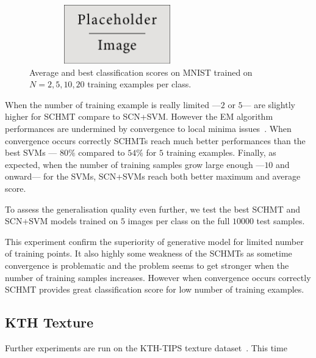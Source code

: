 \documentclass{article}
\begin{document}
		\begin{figure}
			\begin{center}
				\includegraphics[width=3in, height= 1in]{placeholder.jpg}
			  \caption[MNIST: classification scores]{Average and best classification scores on MNIST trained on $N=2,5,10,20$ training examples per class.}
			  \label{fig:SCHMT MNIST}
			\end{center}
			\vspace{-20pt}
		\end{figure}
		When the number of training example is really limited ---\ie $2$ or $5$--- are slightly higher for SCHMT compare to SCN+SVM. However the EM algorithm performances are undermined by convergence to local minima issues~\cite{moon1996expectation}. When convergence occurs correctly SCHMTs reach much better performances than the best SVMs --- $80\%$ compared to $54\%$ for $5$ training examples. Finally, as expected, when the number of training samples grow large enough ---\ie $10$ and onward--- for the SVMs, SCN+SVMs reach both better maximum and average score.
		
		To assess the generalisation quality even further, we test the best SCHMT and SCN+SVM models trained on $5$ images per class on the full $10000$ test samples. %
		
		This experiment confirm the superiority of generative model for limited number of training points. It also highly some weakness of the SCHMTs as sometime convergence is problematic and the problem seems to get stronger when the number of training samples increases. However when convergence occurs correctly SCHMT provides great classification score for low number of training examples.
		
	\subsection{KTH Texture}
		\label{subsec:Exps/KTH Texture}
		
		Further experiments are run on the KTH-TIPS texture dataset~\cite{KTH2016web}. This time 
		
\end{document}
